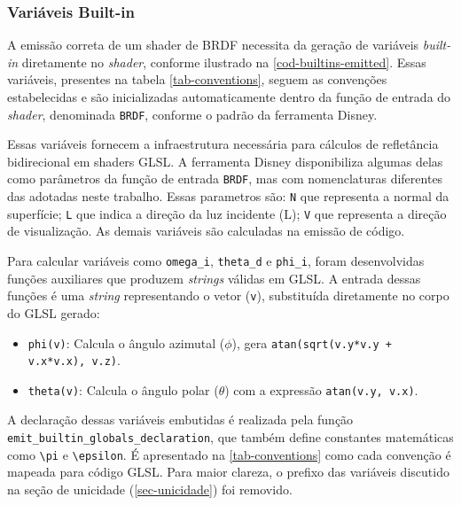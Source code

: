 \subsubsection{Variáveis Built-in}
A emissão correta de um shader de BRDF necessita da geração de variáveis \textit{built-in} diretamente no \textit{shader}, conforme ilustrado na \autoref{cod-builtins-emitted}. Essas variáveis, presentes na tabela \autoref{tab-conventions}, seguem as convenções estabelecidas e são inicializadas automaticamente dentro da função de entrada do \textit{shader}, denominada \verb|BRDF|, conforme o padrão da ferramenta Disney.

Essas variáveis fornecem a infraestrutura necessária para cálculos de refletância bidirecional em shaders GLSL. A ferramenta Disney disponibiliza algumas delas como parâmetros da função de entrada \verb`BRDF`, mas com nomenclaturas diferentes das adotadas neste trabalho. Essas parametros são: \verb"N" que representa a normal da superfície; \verb"L" que indica a direção da luz incidente (L); \verb"V" que representa a direção de visualização. As demais variáveis são calculadas na emissão de código.

Para calcular variáveis como \verb`omega_i`, \verb`theta_d` e \verb`phi_i`, foram desenvolvidas funções auxiliares que produzem \textit{strings} válidas em GLSL. A entrada dessas funções é uma \textit{string} representando o vetor (\verb`v`), substituída diretamente no corpo do GLSL gerado:
\begin{itemize}
    \item \verb`phi(v)`: Calcula o ângulo azimutal ($\phi$), gera \verb`atan(sqrt(v.y*v.y + v.x*v.x), v.z)`.
    \item \verb`theta(v)`: Calcula o ângulo polar ($\theta$) com a expressão \verb`atan(v.y, v.x)`.
\end{itemize}

A declaração dessas variáveis embutidas é realizada pela função \\ \verb`emit_builtin_globals_declaration`, que também define constantes matemáticas como \verb`\pi`  e \verb`\epsilon`. É apresentado na \autoref{tab-conventions} como cada convenção é mapeada para código GLSL. Para maior clareza, o prefixo das variáveis discutido na seção de unicidade (\autoref{sec-unicidade}) foi removido.

